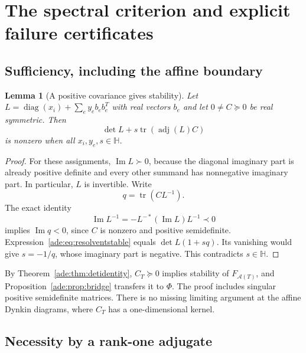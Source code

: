 \documentclass[11pt]{article}
\numberwithin{equation}{section}
\newtheorem{lemma}[theorem]{Lemma}
\theoremstyle{definition}
\newcommand{\diag}{\operatorname{diag}}
\newcommand{\HH}{\mathbb H}
\newcommand{\adj}{\operatorname{adj}}
\newcommand{\tr}{\operatorname{tr}}
\newcommand{\calA}{\mathcal A}
\newcommand{\im}{\operatorname{Im}}
\begin{document}
\section{The spectral criterion and explicit failure certificates}
\label{ade:sec:criterion}

\subsection{Sufficiency, including the affine boundary}

\begin{lemma}[A positive covariance gives stability]
\label{ade:lem:covstable}
Let
$L=\diag(x_i)+\sum_e y_e b_eb_e^T$ with real vectors $b_e$ and let
$0\ne C\succeq0$ be real symmetric.  Then
\begin{equation}
 \det L+s\tr(\adj(L)C)
 \label{ade:eq:resolventstable}
\end{equation}
is nonzero when all $x_i,y_e,s\in\HH$.
\end{lemma}
\begin{proof}
For these assignments, $\im L\succ0$, because the diagonal imaginary
part is already positive definite and every other summand has
nonnegative imaginary part.  In particular, $L$ is invertible.  Write
\[
 q=\tr(CL^{-1}).
\]
The exact identity
\begin{equation}
 \im L^{-1}=-L^{-*}(\im L)L^{-1}\prec0
 \label{ade:eq:imaginaryinverse}
\end{equation}
implies $\im q<0$, since $C$ is nonzero and positive semidefinite.
Expression~\eqref{ade:eq:resolventstable} equals
$\det L(1+sq)$.  Its vanishing would give $s=-1/q$, whose imaginary part
is negative.  This contradicts $s\in\HH$.
\end{proof}

By Theorem~\ref{ade:thm:detidentity}, $C_T\succeq0$ implies stability of
$F_{\calA(T)}$, and Proposition~\ref{ade:prop:bridge} transfers it to $\Phi$.
The proof includes singular positive semidefinite matrices.  There is no
missing limiting argument at the affine Dynkin diagrams, where $C_T$ has
a one-dimensional kernel.

\subsection{Necessity by a rank-one adjugate}
\end{document}
